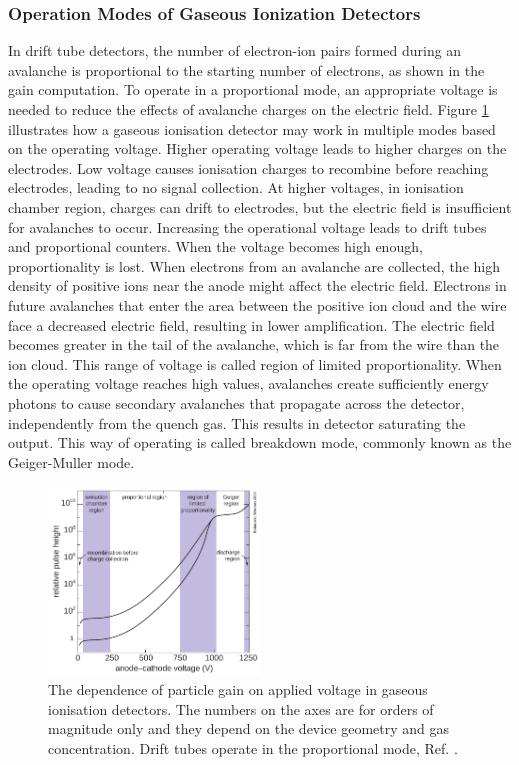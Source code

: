 \subsubsection{Operation Modes of Gaseous Ionization Detectors}
In drift tube detectors, the number of electron-ion pairs formed during an avalanche is 
proportional to the starting number of electrons, as shown in the gain computation. To 
operate in a proportional mode, an appropriate voltage is needed to reduce the effects 
of avalanche charges on the electric field. Figure \ref{fig:gaseous} illustrates how a 
gaseous ionisation detector may work in multiple modes based on the operating voltage. Higher operating 
voltage leads to higher charges on the electrodes. Low voltage causes ionisation charges to recombine 
before reaching electrodes, leading to no signal collection. At higher voltages, in ionisation chamber 
region, charges can drift to electrodes, but the electric field is insufficient for avalanches to occur. 
Increasing the operational voltage leads to drift tubes and proportional counters. When the voltage 
becomes high enough, proportionality is lost. When electrons from an avalanche are collected, 
the high density of positive ions near the anode might affect the electric field. 
Electrons in future avalanches that enter the area between the positive ion cloud and the wire face a 
decreased electric field, resulting in lower amplification. The electric field becomes greater in the 
tail of the avalanche, which is far from the wire than the ion cloud. This range of voltage is called region of 
limited proportionality. When the operating voltage reaches high values, 
avalanches create sufficiently energy photons to cause secondary avalanches 
that propagate across the detector, independently from the quench gas. 
This results in detector saturating the output. This way of operating is 
called breakdown mode, commonly known as the Geiger-Muller mode.
\begin{figure}[!h]
    \centering
    \includegraphics[width =0.5\textwidth]{figures/png/Screenshot_20240330_203416.png}
    \caption{The dependence of particle gain on applied voltage in gaseous ionisation detectors. 
    The numbers on the axes are for orders of magnitude only and they depend on the device geometry and gas concentration. 
    Drift tubes operate in the proportional mode, Ref. \cite{kola}.}
    \label{fig:gaseous}
    \end{figure}
